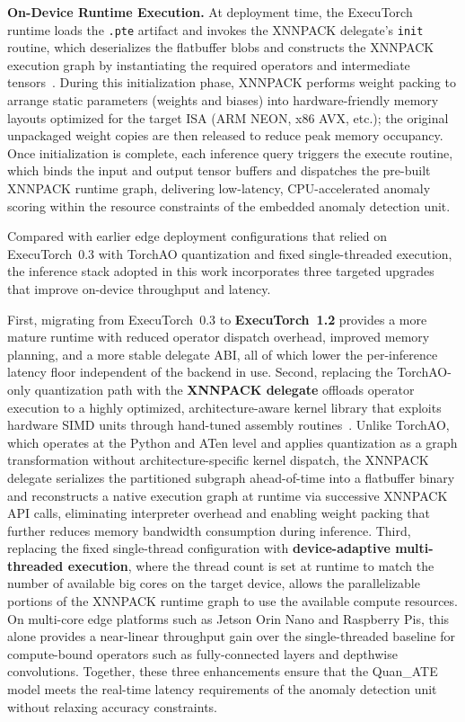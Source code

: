 \documentclass[pdflatex,sn-mathphys-num]{sn-jnl}
\theoremstyle{thmstyleone}
\theoremstyle{thmstyletwo}
\theoremstyle{thmstylethree}
\begin{document}
\textbf{On-Device Runtime Execution.}    
At deployment time, the ExecuTorch runtime loads the \texttt{.pte} artifact and invokes the XNNPACK delegate's \texttt{init} routine, which deserializes the flatbuffer blobs and constructs the XNNPACK execution graph by instantiating the required operators and intermediate tensors~\cite{Executorch_document}. During this initialization phase, XNNPACK performs weight packing to arrange static parameters (weights and biases) into hardware-friendly memory layouts optimized for the target ISA (ARM NEON, x86 AVX, etc.); the original unpackaged weight copies are then released to reduce peak memory occupancy. Once initialization is complete, each inference query triggers the execute routine, which binds the input and output tensor buffers and dispatches the pre-built XNNPACK runtime graph, delivering low-latency, CPU-accelerated anomaly scoring within the resource constraints of the embedded anomaly detection unit.

Compared with earlier edge deployment configurations that relied on ExecuTorch~0.3 with TorchAO quantization and fixed single-threaded execution, the inference stack adopted in this work incorporates three targeted upgrades that improve on-device throughput and latency. 

First, migrating from ExecuTorch~0.3 to \textbf{ExecuTorch~1.2} provides a more mature runtime with reduced operator dispatch overhead, improved memory planning, and a more stable delegate ABI, all of which lower the per-inference latency floor independent of the backend in use. 
Second, replacing the TorchAO-only quantization path with the \textbf{XNNPACK delegate} offloads operator execution to a highly optimized, architecture-aware kernel library that exploits hardware SIMD units through hand-tuned assembly routines~\cite{xnnpack2019}.
Unlike TorchAO, which operates at the Python and ATen level and applies quantization as a graph transformation without architecture-specific kernel dispatch, the XNNPACK delegate serializes the partitioned subgraph ahead-of-time into a flatbuffer binary and reconstructs a native execution graph at runtime via successive XNNPACK API calls, eliminating interpreter overhead and enabling weight packing that further reduces memory bandwidth consumption during inference.
Third, replacing the fixed single-thread configuration with \textbf{device-adaptive multi-threaded execution}, where the thread count is set at runtime to match the number of available big cores on the target device, allows the parallelizable portions of the XNNPACK runtime graph to use the available compute resources. On multi-core edge platforms such as Jetson Orin Nano and Raspberry Pis, this alone provides a near-linear throughput gain over the single-threaded baseline for compute-bound operators such as fully-connected layers and depthwise convolutions.
Together, these three enhancements ensure that the Quan\_ATE model meets the real-time latency requirements of the anomaly detection unit without relaxing accuracy constraints.
\end{document}
